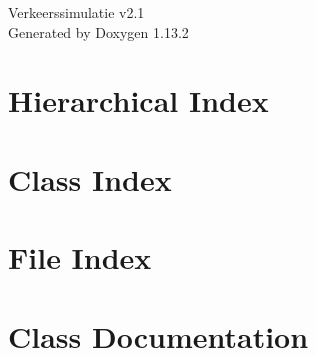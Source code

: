 \documentclass[twoside]{book}
\newcommand{\+}{\discretionary{\mbox{\scriptsize$\hookleftarrow$}}{}{}}
\newcommand{\clearemptydoublepage}{%
    \newpage{\pagestyle{empty}\cleardoublepage}%
  }
\begin{document}
  \raggedbottom
    \hypersetup{pageanchor=false,
                bookmarksnumbered=true,
                pdfencoding=unicode
               }
  \begin{titlepage}
  \vspace*{7cm}
  \begin{center}%
  {\Large Verkeerssimulatie v2.\+1}\\
  \vspace*{1cm}
  {\large Generated by Doxygen 1.13.2}\\
  \end{center}
  \end{titlepage}
  \clearemptydoublepage
  \tableofcontents
  \clearemptydoublepage
  \hypersetup{pageanchor=true}

\chapter{Hierarchical Index}

\chapter{Class Index}

\chapter{File Index}

\chapter{Class Documentation}









































\end{document}

